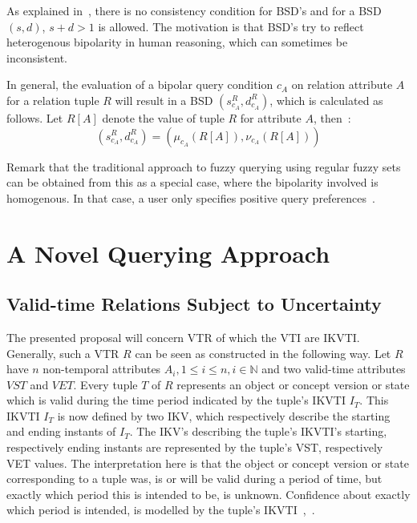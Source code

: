 \documentclass[runningheads,a4paper]{llncs}
\begin{document}
As explained in~\cite{Matthe2011ijis}, there is no consistency condition for BSD's and for a BSD $(s, d)$, $s+d>1$ is allowed. The motivation is that BSD's try to reflect heterogenous bipolarity in human reasoning, which can sometimes be inconsistent.

In general, the evaluation of a bipolar query condition $c_{A}$ on relation attribute $A$ for a relation tuple $R$ will result in a BSD $(s_{c_A}^R, d_{c_A}^R)$, which is calculated as follows. Let $R[A]$ denote the value of tuple $R$ for attribute $A$, then~\cite{Matthe2011ijis}:
\begin{equation}\label{eq:bsdeval}
(s_{c_A}^R, d_{c_A}^R)=(\mu_{c_A}(R[A]), \nu_{c_A}(R[A]))
\end{equation}

Remark that the traditional approach to fuzzy querying using regular fuzzy sets can be obtained from this as a special case, where the bipolarity involved is homogenous. In that case, a user only specifies positive query preferences~\cite{Matthe2011ijis}.


\section{A Novel Querying Approach\label{sec:proposal}}

\subsection{Valid-time Relations Subject to Uncertainty}
The presented proposal will concern VTR of which the VTI are IKVTI. Generally, such a VTR $R$ can be seen as constructed in the following way. Let $R$ have $n$ non-temporal attributes $A_{i}, 1 \leq i \leq n, i \in \mathbb{N}$ and two valid-time attributes $VST$ and $VET$. Every tuple $T$ of $R$ represents an object or concept version or state which is valid during the time period indicated by the tuple's IKVTI $I_T$. This IKVTI $I_T$ is now defined by two IKV, which respectively describe the starting and ending instants of $I_T$. The IKV's describing the tuple's IKVTI's starting, respectively ending instants are represented by the tuple's VST, respectively VET values. The interpretation here is that the object or concept version or state corresponding to a tuple was, is or will be valid during a period of time, but exactly which period this is intended to be, is unknown. Confidence about exactly which period is intended, is modelled by the tuple's IKVTI~\cite{Pons2012ijcis},~\cite{Pons2012ipmu}.
\end{document}
